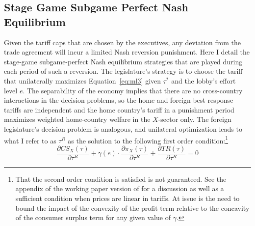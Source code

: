 \documentclass[authoryear, review]{elsarticle}
\newcommand{\ga}{\gamma}
\begin{document}
\subsection{Stage Game Subgame Perfect Nash Equilibrium}
\label{sec:stagespne}
Given the tariff caps that are chosen by the executives, any deviation from the trade agreement will incur a limited Nash reversion punishment. Here I detail the stage-game subgame-perfect Nash equilibrium strategies that are played during each period of such a reversion. The legislature's strategy is to choose the tariff that unilaterally maximizes Equation~\ref{eq:ml3} given $\tau^*$ and the lobby's effort level $e$. The separability of the economy implies that there are no cross-country interactions in the decision problems, so the home and foreign best response tariffs are independent and the home country's tariff in a punishment period maximizes weighted home-country welfare in the $X$-sector only. The foreign legislature's decision problem is analogous, and unilateral optimization leads to what I refer to as $\tau^R$ as the solution to the following first order condition:\footnote{That the second order condition is satisfied is not guaranteed. See the appendix of the working paper version of \citet{buzard2013b} for a discussion as well as a sufficient condition when prices are linear in tariffs. At issue is the need to bound the impact of the convexity of the profit term relative to the concavity of the consumer surplus term for any given value of $\ga$.\label{fn:legsoc}}
\begin{equation}
		\frac{\partial \mathit{CS}_X(\tau)}{\partial \tau^R} + \ga(e) \cdot \frac{\partial \pi_X(\tau)}{\partial \tau^R} +  \frac{\partial \mathit{TR}(\tau)}{\partial \tau^R} = 0
		\label{eq:leguni}
\end{equation}
\end{document}

